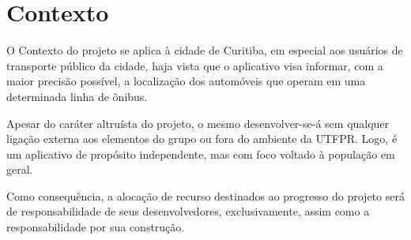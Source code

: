\chapter{Contexto}\label{cap:contexto}

O Contexto do projeto se aplica à cidade de Curitiba, em especial aos usuários de transporte público da cidade, haja vista que o aplicativo visa informar, com a maior precisão possível, a localização dos automóveis que operam em uma determinada linha de ônibus. 

Apesar do caráter altruísta do projeto, o mesmo desenvolver-se-á sem qualquer ligação externa aos elementos do grupo ou fora do ambiente da UTFPR. Logo, é um aplicativo de propósito independente, mas com foco voltado à população em geral. 

Como consequência, a alocação de recurso destinados ao progresso do  projeto será de responsabilidade de seus desenvolvedores, exclusivamente, assim como a responsabilidade por sua construção.

